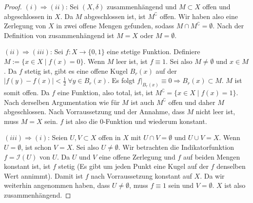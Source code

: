 \documentclass[10pt,a4paper]{article}
\begin{document}
\begin{proof}
  $(i) \Rightarrow (ii)$: Sei $(X, \delta)$ zusammenhängend und $M \subset X$
  offen und abgeschlossen in $X$. Da $M$ abgeschlossen ist, ist
  $M^{\complement}$ offen. Wir haben also eine Zerlegung von $X$ in zwei offene
  Mengen gefunden, sodass $M \cap M^{\complement} = \emptyset$. Nach der
  Definition von zusammenhängend ist $M = X$ oder $M = \emptyset$.

  $(ii) \Rightarrow (iii)$: Sei $f : X \to \{ 0, 1 \}$ eine stetige
  Funktion. Definiere $M := \{ x \in X \mid f(x) = 0 \}$. Wenn $M$ leer ist, ist
  $f \equiv 1$. Sei also $M \ne \emptyset$ und $x \in M$. Da $f$ stetig ist,
  gibt es eine offene Kugel $B_{r}(x)$ auf der
  $|f(y) - f(x)| < \frac{1}{2}\ \forall y \in B_{r}(x)$. Es folgt
  $f|_{B_{r}(x)} \equiv 0 \Rightarrow B_{r}(x) \subset M$. $M$ ist somit
  offen. Da $f$ eine Funktion, also total, ist, ist
  $M^{\complement} = \{ x \in X \mid f(x) = 1 \}$. Nach derselben Argumentation
  wie für $M$ ist auch $M^{\complement}$ offen und daher $M$ abgeschlossen. Nach
  Vorraussetzung und der Annahme, dass $M$ nicht leer ist, muss $M = X$
  sein. $f$ ist also die $0$-Funktion und wiederum konstant.

  $(iii) \Rightarrow (i)$: Seien $U, V \subset X$ offen in $X$ mit
  $U \cap V = \emptyset$ und $U \cup V = X$. Wenn $U = \emptyset$, ist schon
  $V = X$. Sei also $U \ne \emptyset$. Wir betrachten die Indikatorfunktion
  $f = \mathcal{I}(U)$ von $U$. Da $U$ und $V$ eine offene Zerlegung und $f$ auf
  beiden Mengen konstant ist, ist $f$ stetig (Es gibt um jeden Punkt eine Kugel
  auf der $f$ denselben Wert annimmt). Damit ist $f$ nach Vorraussetzung
  konstant auf $X$. Da wir weiterhin angenommen haben, dass $U \ne \emptyset$,
  muss $f \equiv 1$ sein und $V = \emptyset$. $X$ ist also zusammenhängend.
\end{proof}
\end{document}
